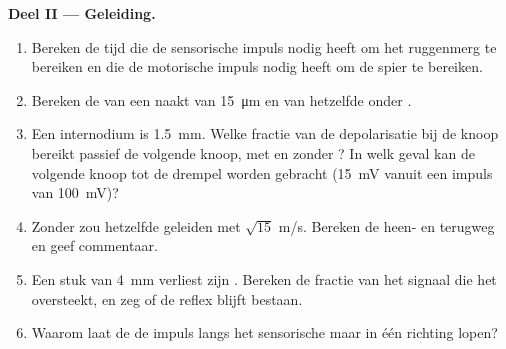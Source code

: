 \begin{problem}
\medskip
\noindent\textbf{Deel II --- Geleiding.}
\begin{enumerate}[resume]
  \item Bereken de tijd die de sensorische impuls nodig heeft om het
        ruggenmerg te bereiken en die de motorische impuls nodig heeft om de
        spier te bereiken.
  \item Bereken de  van een naakt  van \qty{15}{\micro m}
        en van hetzelfde  onder .
  \item Een internodium is \qty{1.5}{mm}. Welke fractie van de depolarisatie
        bij de knoop bereikt passief de volgende knoop, met en zonder
        ? In welk geval kan de volgende knoop tot de drempel worden
        gebracht (\qty{15}{mV} vanuit een impuls van \qty{100}{mV})?
  \item Zonder  zou hetzelfde  geleiden met $\sqrt{15}$
        m/s. Bereken de heen- en terugweg en geef commentaar.
  \item Een stuk van \qty{4}{mm} verliest zijn . Bereken de fractie
        van het signaal die het oversteekt, en zeg of de reflex blijft
        bestaan.
  \item Waarom laat de  de impuls langs het sensorische
         maar in één richting lopen?
\end{enumerate}


\end{problem}
